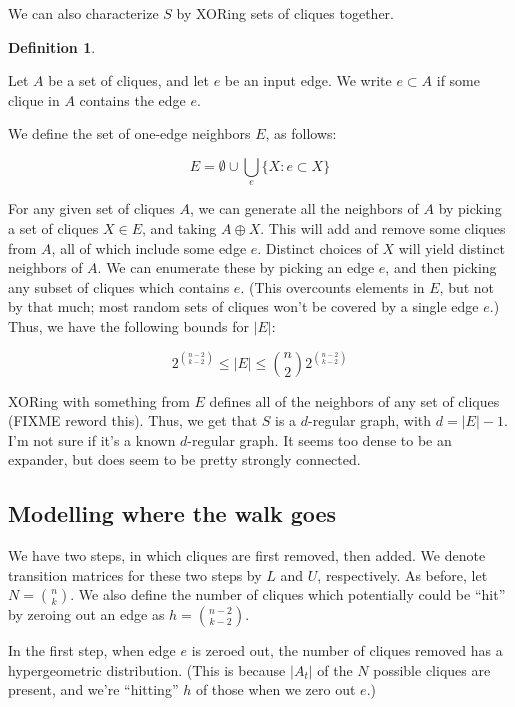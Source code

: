 \documentclass[12pt]{article}
\theoremstyle{definition}
\newtheorem{defn}{Definition}[section]
\begin{document}
We can also characterize $S$ by XORing sets of cliques together.

\begin{defn} \label{def:oneEdgeNeighbors}

Let $A$ be a set of cliques, and let $e$ be an input edge. We write
$e \subset A$ if some clique in $A$ contains the edge $e$.

We define the set of one-edge neighbors $E$, as follows:

\[
E = \emptyset \cup \bigcup_e \{ X: e \subset X\}
\]

\end{defn}

For any given set of cliques $A$, we can generate all the neighbors
of $A$ by picking a set of cliques $X \in E$, and taking $A \oplus X$. This will
add and remove some cliques from $A$, all of which include some edge $e$.
Distinct choices of $X$ will yield distinct neighbors of $A$.
We can enumerate these by picking an edge $e$, 
and then picking any subset of cliques which contains $e$. (This overcounts
elements in $E$, but not by that much; most random sets of cliques won't be
covered by a single edge $e$.) Thus, we have the following bounds for $|E|$:

\[
2^{{n-2} \choose {k-2}} \le |E| \le {n \choose 2} 2^{{n-2} \choose {k-2}}
\]

XORing with something from $E$ defines all of the neighbors of any set of cliques
(FIXME reword this).
Thus, we get that $S$ is a $d$-regular graph, with $d = |E|-1$.
I'm not sure if it's a known $d$-regular graph.
It seems too
dense to be an expander, but does seem to be pretty strongly connected.

\subsection{Modelling where the walk goes}

We have two steps, in which cliques are first removed, then added.
We denote transition matrices for these two steps by $L$ and $U$, respectively.
As before, let $N = {n \choose k}$.
We also define the number of cliques which potentially could be ``hit'' by
zeroing out an edge as $h = {{n-2} \choose {k-2}}$.

In the first step, when edge $e$ is zeroed out, the number of cliques removed has
a hypergeometric distribution. (This is because $|A_t|$ of the $N$ possible cliques
are present, and we're ``hitting'' $h$ of those when we zero out $e$.)
\end{document}
